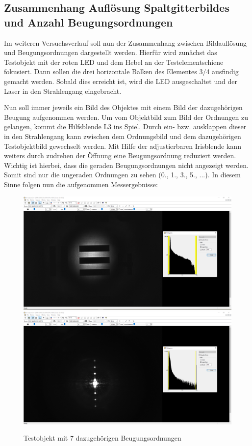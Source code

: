\documentclass[12pt,a4paper,twoside]{article}
\begin{document}
\subsection{Zusammenhang Auflösung Spaltgitterbildes und Anzahl Beugungsordnungen}

Im weiteren Versuchsverlauf soll nun der Zusammenhang zwischen Bildauflösung und Beugungsordnungen dargestellt werden. 
Hierfür wird zunächst das Testobjekt mit der roten LED und dem Hebel an der Testelementschiene fokusiert. Dann sollen die drei horizontale Balken des Elementes 3/4 ausfindig gemacht werden.
Sobald dies erreicht ist, wird die LED ausgeschaltet und der Laser in den Strahlengang eingebracht. \newline

\noindent
Nun soll immer jeweils ein Bild des Objektes mit einem Bild der dazugehörigen Beugung aufgenommen werden.
Um vom Objektbild zum Bild der Ordnungen zu gelangen, kommt die Hilfsblende L3 ins Spiel. Durch ein- bzw. ausklappen dieser in den Strahlengang kann zwischen dem Ordnungsbild und dem dazugehörigen Testobjektbild gewechselt werden.
Mit Hilfe der adjustierbaren Irisblende kann weiters durch zudrehen der Öffnung eine Beugungsordnung reduziert werden. Wichtig ist hierbei, dass die geraden Beugungsordnungen nicht angezeigt werden.
Somit sind nur die ungeraden Ordnungen zu sehen (0., 1., 3., 5., ...). In diesem Sinne folgen nun die aufgenommen Messergebnisse:

\begin{figure}[H]
    \centering
    \includegraphics[width=0.45\linewidth]{nudes/AbbeTheorie/Aufgabe 2/horizontal/7te ohne.PNG}
    \includegraphics[width=0.45\linewidth]{nudes/AbbeTheorie/Aufgabe 2/horizontal/7te mit.PNG}
    \caption{Testobjekt mit 7 dazugehörigen Beugungsordnungen}
    \label{fig:Aufabe2-7O}
\end{figure}
\end{document}
